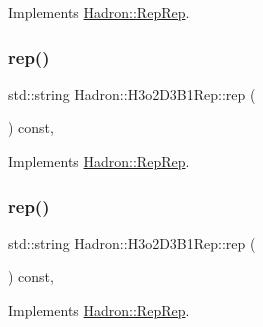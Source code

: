 Implements \mbox{\hyperlink{structHadron_1_1RepRep_ab3213025f6de249f7095892109575fde}{Hadron\+::\+Rep\+Rep}}.

\mbox{\label{structHadron_1_1H3o2D3B1Rep_acf8f745ca578c355ecbb4097e8c0ce39}} 
\subsubsection{\texorpdfstring{rep()}{rep()}\hspace{0.1cm}{\footnotesize\ttfamily [2/5]}}
{\footnotesize\ttfamily std\+::string Hadron\+::\+H3o2\+D3\+B1\+Rep\+::rep (\begin{DoxyParamCaption}{ }\end{DoxyParamCaption}) const\hspace{0.3cm}{\ttfamily [inline]}, {\ttfamily [virtual]}}



Implements \mbox{\hyperlink{structHadron_1_1RepRep_ab3213025f6de249f7095892109575fde}{Hadron\+::\+Rep\+Rep}}.

\mbox{\label{structHadron_1_1H3o2D3B1Rep_acf8f745ca578c355ecbb4097e8c0ce39}} 
\subsubsection{\texorpdfstring{rep()}{rep()}\hspace{0.1cm}{\footnotesize\ttfamily [3/5]}}
{\footnotesize\ttfamily std\+::string Hadron\+::\+H3o2\+D3\+B1\+Rep\+::rep (\begin{DoxyParamCaption}{ }\end{DoxyParamCaption}) const\hspace{0.3cm}{\ttfamily [inline]}, {\ttfamily [virtual]}}



Implements \mbox{\hyperlink{structHadron_1_1RepRep_ab3213025f6de249f7095892109575fde}{Hadron\+::\+Rep\+Rep}}.

\mbox{\label{structHadron_1_1H3o2D3B1Rep_acf8f745ca578c355ecbb4097e8c0ce39}} 
